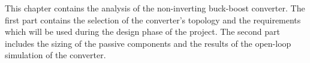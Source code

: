 
This chapter contains the analysis of the non-inverting buck-boost converter. The first part contains the selection of the converter's topology and the requirements which will be used during the design phase of the project. The second part includes the sizing of the passive components and the results of the open-loop simulation of the converter.
